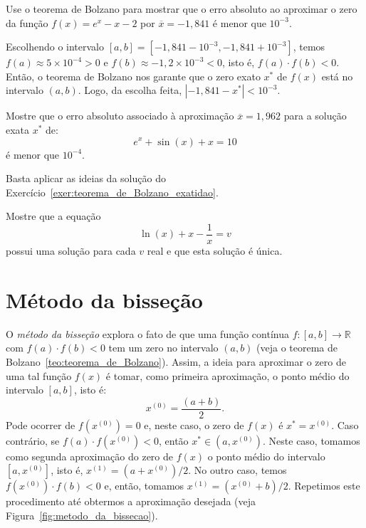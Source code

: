 \begin{exer}\label{exer:teorema_de_Bolzano_exatidao} Use o teorema de Bolzano para mostrar que o erro absoluto ao aproximar o zero da função $f(x)=e^x-x-2$ por $\overline{x}=-1,841$ é menor que $10^{-3}$.
\end{exer}
\begin{resp}
  
    Escolhendo o intervalo $[a, b] = [-1,841-10^{-3}, -1,841+10^{-3}]$, temos $f(a)\approx 5\times 10^{-4} > 0$ e $f(b)\approx -1,2\times 10^{-3} < 0$, isto é, $f(a)\cdot f(b) < 0$. Então, o teorema de Bolzano nos garante que o zero exato $x^*$ de $f(x)$ está no intervalo $(a, b)$. Logo, da escolha feita, $|-1,841 - x^*| < 10^{-3}$.
  
\end{resp}

\begin{exer} Mostre que o erro absoluto associado à aproximação $\overline{x} = 1,962$ para a solução exata $x^*$ de:
  \begin{equation*}
    e^x+\sin (x) +x = 10  
  \end{equation*}
é menor que $10^{-4}$.
\end{exer}
\begin{resp}
  Basta aplicar as ideias da solução do Exercício~\ref{exer:teorema_de_Bolzano_exatidao}.
\end{resp}

\begin{exer}\label{existe_unica} Mostre que a equação
  \begin{equation*}
    \ln(x)+x-\frac{1}{x}=v
  \end{equation*}
possui uma solução para cada $v$ real e que esta solução é única.
\end{exer}

\section{Método da bisseção}

O \emph{método da bisseção} explora o fato de que uma função contínua $f:[a, b]\to \mathbb{R}$ com $f(a)\cdot f(b) < 0$ tem um zero no intervalo $(a, b)$ (veja o teorema de Bolzano~\ref{teo:teorema_de_Bolzano}). Assim, a ideia para aproximar o zero de uma tal função $f(x)$ é tomar, como primeira aproximação, o ponto médio do intervalo $[a, b]$, isto é:
\begin{equation*}
  x^{(0)} = \frac{(a + b)}{2}. 
\end{equation*}
Pode ocorrer de $f(x^{(0)}) = 0$ e, neste caso, o zero de $f(x)$ é $x^* = x^{(0)}$. Caso contrário, se $f(a)\cdot f(x^{(0)}) < 0$, então $x^*\in (a, x^{(0)})$. Neste caso, tomamos como segunda aproximação do zero de $f(x)$ o ponto médio do intervalo $[a, x^{(0)}]$, isto é, $x^{(1)} = (a + x^{(0)})/2$. No outro caso, temos $f(x^{(0)})\cdot f(b) < 0$ e, então, tomamos $x^{(1)} = (x^{(0)} + b)/2$. Repetimos este procedimento até obtermos a aproximação desejada (veja Figura~\ref{fig:metodo_da_bissecao}).
 
